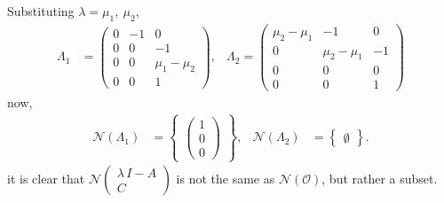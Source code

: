 Substituting $\lambda = \mu_1,\ \mu_2$,
\begin{align*}
    \Lambda_1 &= \begin{pmatrix}
        0 & -1 & 0 \\ 0 & 0 & -1 \\ 0 & 0 & \mu_1 - \mu_2 \\ 0 & 0 & 1
    \end{pmatrix}, & \Lambda_2 = \begin{pmatrix}
        \mu_2 - \mu_1 & -1 & 0 \\ 0 & \mu_2 - \mu_1 & -1\\ 0 & 0 & 0 \\ 0 & 0 & 1
    \end{pmatrix}
\end{align*}
now, 
\begin{align*}
    \mathcal{N}\left(\Lambda_1\right) &= \begin{Bmatrix} \begin{pmatrix}
        1 \\ 0 \\ 0
    \end{pmatrix} \end{Bmatrix} , & \mathcal{N}\left(\Lambda_2\right) &= \begin{Bmatrix} \emptyset \end{Bmatrix}.
\end{align*}
it is clear that $\mathcal{N}\begin{pmatrix}
    \lambda\,I - A \\ C
\end{pmatrix}$ is not the same as $\mathcal{N}\left(\mathcal{O}\right)$, but rather a subset.

